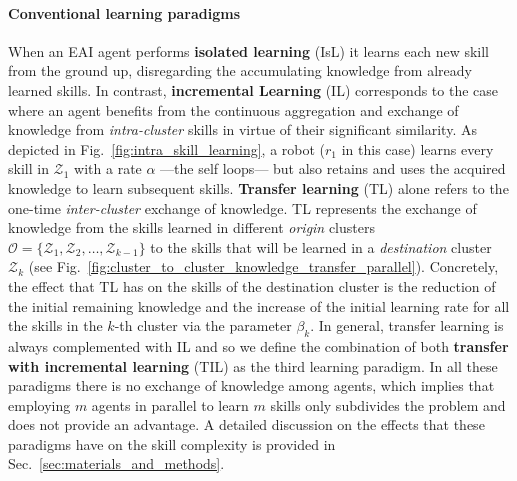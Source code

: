 \documentclass[12pt]{article}
\renewcommand{\emph}[1]{\textit{#1}}
\begin{document}
\paragraph*{Conventional learning paradigms} 
When an EAI agent performs \textbf{isolated learning} (IsL) it learns each new skill from the ground up, disregarding the accumulating knowledge from already learned skills. In contrast, \textbf{incremental Learning} (IL) corresponds to the case where an agent benefits from the continuous aggregation and exchange of knowledge from \emph{intra-cluster} skills in virtue of their significant similarity. As depicted in Fig.~\ref{fig:intra_skill_learning}, a robot ($r_1$ in this case) learns every skill in $\mathcal{Z}_1$ with a rate $\alpha$ ---the self loops--- but also retains and uses the acquired knowledge to learn subsequent skills. \textbf{Transfer learning} (TL) alone refers to the one-time \emph{inter-cluster} exchange of knowledge. TL represents the exchange of knowledge from the skills learned in different \emph{origin} clusters $\mathcal{O} = \{ \mathcal{Z}_1,\mathcal{Z}_2,\ldots,\mathcal{Z}_{k-1} \}$ to the skills that will be learned in a \emph{destination} cluster $\mathcal{Z}_k$ (see Fig.~\ref{fig:cluster_to_cluster_knowledge_transfer_parallel}). Concretely, the effect that TL has on the skills of the destination cluster is the reduction of the initial remaining knowledge and the increase of the initial learning rate for all the skills in the $k$-th cluster via the parameter $\beta_k$. In general, transfer learning is always complemented with IL and so we define the combination of both \textbf{transfer with incremental learning} (TIL) as the third learning paradigm. In all these paradigms there is no exchange of knowledge among agents, which implies that employing $m$ agents in parallel to learn $m$ skills only subdivides the problem and does not provide an advantage. A detailed discussion on the effects that these paradigms have on the skill complexity is provided in Sec.~\ref{sec:materials_and_methods}.

\end{document}
